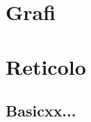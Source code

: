 \documentclass[oneside,12pt]{memoir}
\begin{document}
\chapter{Grafi}
\PartialToc

\chapter{Reticolo}
\PartialToc

\section{Basicxx...}

\stopcontents[chapters]
\clearpage

\printindex
\end{document}
